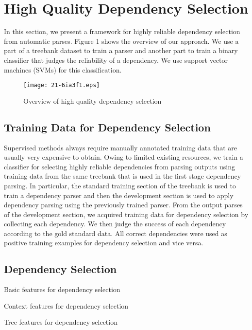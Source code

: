 \documentclass[english]{jnlp_1.4}
\begin{document}
\section{High Quality Dependency Selection}\label{system}

In this section, we present a framework for highly reliable dependency
selection from automatic parses. Figure 1 shows the overview of our
approach. We use a part of a treebank dataset to train a parser and another part to train a binary classifier that judges the reliability of a dependency. 
We use support vector machines (SVMs) for 
this classification.

\begin{figure}[b]
\begin{center}
\texttt{[image: 21-6ia3f1.eps]}
\end{center}
\caption{Overview of high quality dependency selection}
\end{figure}


\subsection{Training Data for Dependency Selection}

Supervised methods always require manually annotated training data
that are usually very expensive to obtain. Owing to limited existing
resources, we train a classifier for selecting highly reliable
dependencies from parsing outputs using training data from the same
treebank that is used in the first stage dependency parsing.
In particular, the standard training section of the treebank is used to
train a dependency parser and then the development section is used to apply
dependency parsing using the previously trained parser.
From the output parses of the development section, we acquired
training data for dependency selection by collecting each dependency.
We then judge the success of each dependency according to the gold
standard data. All correct dependencies were used as positive training examples for dependency selection and
vice versa.


\subsection{Dependency Selection}\label{subsec-filtering}

\begin{table}[b]
\caption{Basic features for dependency selection}

\end{table}
\begin{table}[b]
\caption{Context features for dependency selection}

\end{table}
\begin{table}[b]
\caption{Tree features for dependency selection}

\end{table}
\end{document}
